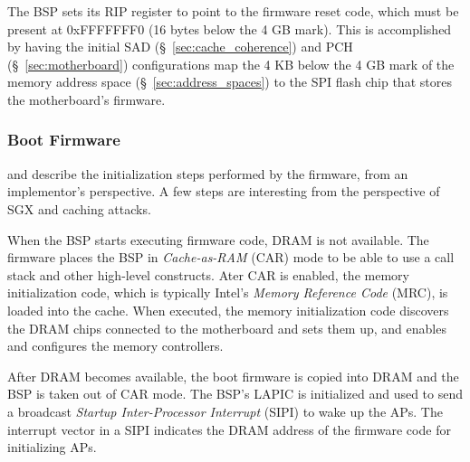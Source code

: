 
The BSP sets its RIP register to point to the firmware reset code, which must
be present at 0xFFFFFFF0 (16 bytes below the 4 GB mark). This is accomplished
by having the initial SAD (\S~\ref{sec:cache_coherence}) and PCH
(\S~\ref{sec:motherboard}) configurations map the 4 KB below the 4 GB mark of
the memory address space (\S~\ref{sec:address_spaces}) to the SPI flash chip
that stores the motherboard's firmware.

\subsubsection{Boot Firmware}
\label{sec:firmware_boot}

\cite{intel2010booting} and \cite{coreboot2015manual} describe the
initialization steps performed by the firmware, from an implementor's
perspective. A few steps are interesting from the perspective of SGX and
caching attacks.


When the BSP starts executing firmware code, DRAM is not available. The
firmware places the BSP in \textit{Cache-as-RAM} (CAR) mode to be able to use a
call stack and other high-level constructs. Ater CAR is enabled, the memory
initialization code, which is typically Intel's \textit{Memory Reference Code}
(MRC), is loaded into the cache. When executed, the memory initialization code
discovers the DRAM chips connected to the motherboard and sets them up, and
enables and configures the memory controllers.

After DRAM becomes available, the boot firmware is copied into DRAM and the BSP
is taken out of CAR mode. The BSP's LAPIC is initialized and used to send a
broadcast \textit{Startup Inter-Processor Interrupt} (SIPI) to wake up the
APs. The interrupt vector in a SIPI indicates the DRAM address of the firmware
code for initializing APs.



